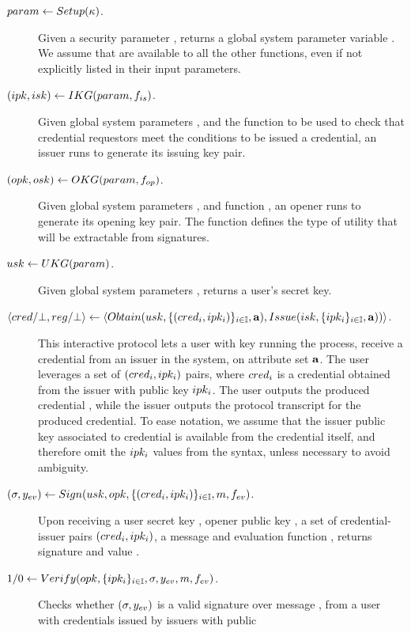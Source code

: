 \begin{description}
\item[$param \gets Setup(\kappa)$.] Given a security parameter \secpar,
  returns a global system parameter variable \parm. We assume that \parm are
  available to all the other functions, even if not explicitly listed in their
  input parameters.
\item[$(ipk,isk) \gets IKG(param,f_{is})$.] Given global system
  parameters \parm, and the function \fissue to be used to check that credential
  requestors meet the conditions to be issued a credential, an issuer runs
  \IKeyGen to generate its issuing key pair. 
\item[$(opk,osk) \gets OKG(param,f_{op})$.] Given global system
  parameters \parm, and function \finsp, an opener runs \OKeyGen to generate
  its opening key pair. The function \finsp defines the type of utility that
  will be extractable from signatures.
\item[$usk \gets UKG(param)$.] Given global system parameters
  \parm, returns a user's secret key.
\item[$\langle cred/\bot,reg/\bot \rangle \gets
  \langle
  Obtain(usk,\lbrace (cred_i,ipk_i)\rbrace_{i \in \mathbb{I}},\mathbf{a}),
  Issue(isk,\lbrace ipk_i \rbrace_{i \in \mathbb{I}},\mathbf{a}))
  \rangle$.] %
  This interactive protocol lets a user with key \usk running the
  \Obtain process, receive a credential \cred from an issuer in the system, on
  attribute set $\mathbf{a}$. The user leverages a set of $(cred_i,ipk_i)$ pairs,
  where $cred_i$ is a credential obtained from the issuer with public
  key $ipk_i$. The user outputs the produced credential \cred, while
  the issuer outputs the protocol transcript \utrans for the produced
  credential. To ease notation, we assume that the issuer public key associated
  to credential is available from the credential itself, and therefore
  omit the $ipk_i$ values from the syntax, unless necessary to avoid
  ambiguity.
\item[$(\sigma,y_{ev}) \gets Sign(usk,opk,\lbrace (cred_i,ipk_i)
  \rbrace_{i \in \mathbb{I}},m,f_{ev})$.] %
  Upon receiving a user secret key \usk, opener public key \opk, a set of
  credential-issuer pairs $(cred_i,ipk_i)$, a message \msg and evaluation
  function \feval, returns signature \sig and value \yeval.
\item[$1/0 \gets Verify(opk, \lbrace ipk_i \rbrace_{i \in \mathbb{I}},\sigma,
  y_{ev},m,f_{ev})$.] Checks whether $(\sigma,y_{ev})$ is a valid signature
  over message \msg, from a user with credentials issued by issuers with public

\end{description}
